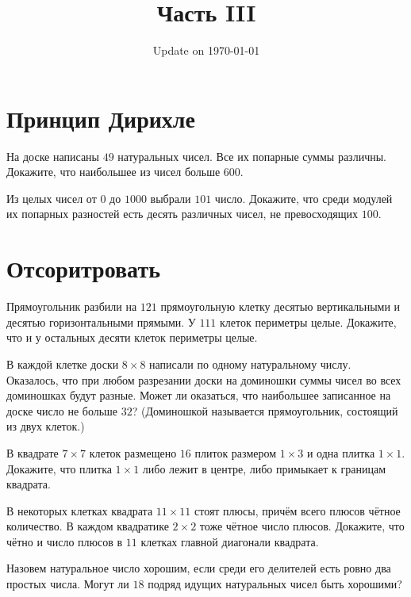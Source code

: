 \documentclass[12pt]{article}
\begin{document}
\fontsize{12}{12}\selectfont

\title{\bf \huge Часть III}
\date{Update on \today}
\maketitle 

\section*{Принцип Дирихле}

\begin{task}
На доске написаны $49$ натуральных чисел. Все их попарные суммы различны. Докажите, что наибольшее из чисел больше $600$.
\end{task}

\begin{task}
Из целых чисел от $0$ до $1000$ выбрали $101$ число. Докажите, что среди модулей их попарных разностей есть десять различных чисел, не превосходящих $100$.
\end{task}



\section*{Отсоритровать}

\begin{task}
\item Прямоугольник разбили на $121$ прямоугольную клетку десятью вертикальными и десятью горизонтальными прямыми. У $111$ клеток периметры целые. Докажите, что и у остальных десяти клеток периметры целые.
\end{task}

\begin{task} В каждой клетке доски $8 \times 8$ написали по одному натуральному числу. Оказалось, что при любом разрезании доски на доминошки суммы чисел во всех доминошках будут разные. Может ли оказаться, что наибольшее записанное на доске число не больше $32$? (Доминошкой называется прямоугольник, состоящий из двух клеток.)
\end{task}

\begin{task} В квадрате $7 \times 7$ клеток размещено $16$ плиток размером $1 \times 3$ и одна плитка $1 \times 1$. Докажите, что плитка $1 \times 1$ либо лежит в центре, либо примыкает к границам квадрата. 
\end{task}

\begin{task} В некоторых клетках квадрата $11 \times 11$ стоят плюсы, причём всего плюсов чётное количество. В каждом квадратике $2 \times 2$ тоже чётное число плюсов. Докажите, что чётно и число плюсов в $11$ клетках главной диагонали квадрата.
\end{task}

\begin{task} Назовем натуральное число хорошим, если среди его делителей есть ровно два простых числа. Могут ли $18$ подряд идущих натуральных чисел быть хорошими?
\end{task}

\begin{solution}

\end{solution}
\end{document}
